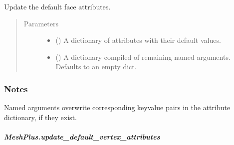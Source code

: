 \documentclass[letterpaper,10pt,english]{sphinxmanual}
\begin{document}
\begin{fulllineitems}
\begin{fulllineitems}
\label{\detokenize{api/generated/directional_clustering.mesh.MeshPlus.update_default_face_attributes:directional_clustering.mesh.MeshPlus.update_default_face_attributes}}
Update the default face attributes.
\begin{quote}\begin{description}
\item[{Parameters}] \leavevmode\begin{itemize}
\item {} 
 () \textendash{} A dictionary of attributes with their default values.

\item {} 
 () \textendash{} A dictionary compiled of remaining named arguments.
Defaults to an empty dict.

\end{itemize}

\end{description}\end{quote}
\subsubsection*{Notes}

Named arguments overwrite corresponding key\sphinxhyphen{}value pairs in the attribute dictionary,
if they exist.

\end{fulllineitems}



\subparagraph{MeshPlus.update\_default\_vertex\_attributes}
\label{\detokenize{api/generated/directional_clustering.mesh.MeshPlus.update_default_vertex_attributes:meshplus-update-default-vertex-attributes}}\label{\detokenize{api/generated/directional_clustering.mesh.MeshPlus.update_default_vertex_attributes::doc}}


\end{fulllineitems}
\end{document}
